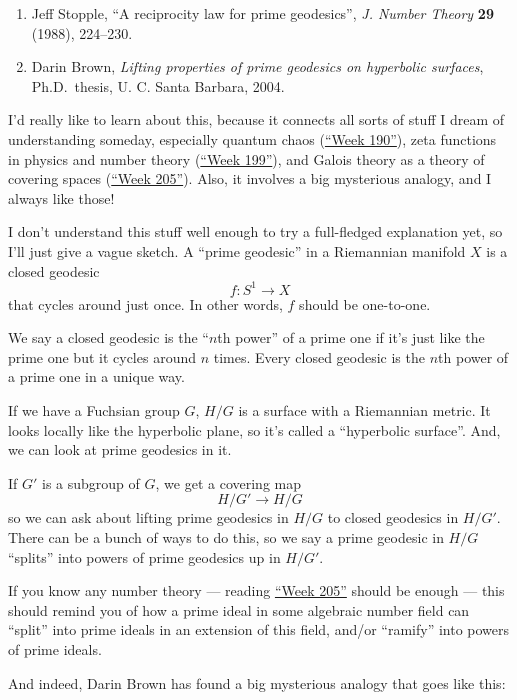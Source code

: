 \documentclass{article}
\begin{document}
\begin{enumerate}
\def\labelenumi{\arabic{enumi})}
\setcounter{enumi}{4}
\item
  Jeff Stopple, ``A reciprocity law for prime geodesics'', \emph{J.
  Number Theory} \textbf{29} (1988), 224--230.
\item
  Darin Brown, \emph{Lifting properties of prime geodesics on hyperbolic
  surfaces}, Ph.D.~thesis, U. C. Santa Barbara, 2004.
\end{enumerate}

I'd really like to learn about this, because it connects all sorts of
stuff I dream of understanding someday, especially quantum chaos
(\protect\hyperlink{week190}{``Week 190''}), zeta functions in physics
and number theory (\protect\hyperlink{week199}{``Week 199''}), and
Galois theory as a theory of covering spaces
(\protect\hyperlink{week205}{``Week 205''}). Also, it involves a big
mysterious analogy, and I always like those!

I don't understand this stuff well enough to try a full-fledged
explanation yet, so I'll just give a vague sketch. A ``prime geodesic''
in a Riemannian manifold \(X\) is a closed geodesic
\[f\colon S^1 \to X\] that cycles around just once. In other words,
\(f\) should be one-to-one.

We say a closed geodesic is the ``\(n\)th power'' of a prime one if it's
just like the prime one but it cycles around \(n\) times. Every closed
geodesic is the \(n\)th power of a prime one in a unique way.

If we have a Fuchsian group \(G\), \(H/G\) is a surface with a
Riemannian metric. It looks locally like the hyperbolic plane, so it's
called a ``hyperbolic surface''. And, we can look at prime geodesics in
it.

If \(G'\) is a subgroup of \(G\), we get a covering map \[H/G' \to H/G\]
so we can ask about lifting prime geodesics in \(H/G\) to closed
geodesics in \(H/G'\). There can be a bunch of ways to do this, so we
say a prime geodesic in \(H/G\) ``splits'' into powers of prime
geodesics up in \(H/G'\).

If you know any number theory --- reading
\protect\hyperlink{week205}{``Week 205''} should be enough --- this
should remind you of how a prime ideal in some algebraic number field
can ``split'' into prime ideals in an extension of this field, and/or
``ramify'' into powers of prime ideals.

And indeed, Darin Brown has found a big mysterious analogy that goes
like this:
\end{document}
